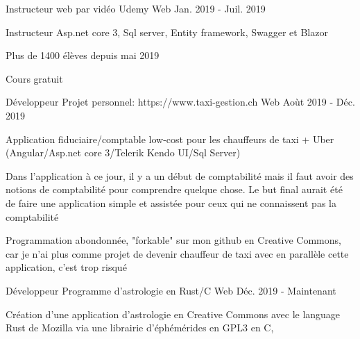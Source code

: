 

\begin{cventries}

  \cventry
    {Instructeur web par vidéo} %
    {Udemy} %
    {Web} %
    {Jan. 2019 - Juil. 2019} %
    {
      \begin{cvitems} %
        \item {Instructeur Asp.net core 3, Sql server, Entity framework, Swagger et Blazor}
        \item {Plus de 1400 élèves depuis mai 2019}
        \item {Cours gratuit}
      \end{cvitems}
    }

  \cventry
    {Développeur} %
    {Projet personnel: https://www.taxi-gestion.ch} %
    {Web} %
    {Aoùt 2019 - Déc. 2019} %
    {
      \begin{cvitems} %
        \item {Application fiduciaire/comptable low-cost pour les chauffeurs de taxi + Uber (Angular/Asp.net core 3/Telerik Kendo UI/Sql Server)}
        \item {Dans l'application à ce jour, il y a un début de comptabilité mais il faut avoir des notions de comptabilité pour comprendre quelque chose. Le but final aurait été de faire une application simple et assistée pour ceux qui ne connaissent pas la comptabilité}
        \item {Programmation abondonnée, "forkable" sur mon github en Creative Commons, car je n'ai plus comme projet de devenir chauffeur de taxi avec en parallèle cette application, c'est trop risqué}
      \end{cvitems}
    }

  \cventry
    {Développeur} %
    {Programme d'astrologie en Rust/C} %
    {Web} %
    {Déc. 2019 - Maintenant} %
    {
      \begin{cvitems} %
        \item {Création d'une application d'astrologie en Creative Commons avec le language Rust de Mozilla via une librairie d'éphémérides en GPL3 en C},
      \end{cvitems}
    }


\end{cventries}
